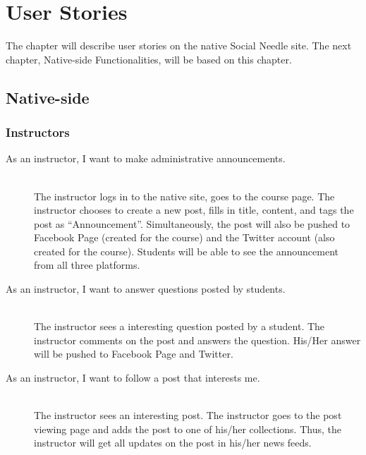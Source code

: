 
%
%

\chapter{User Stories}
The chapter will describe user stories on the native Social Needle site. The next chapter, Native-side Functionalities, will be based on this chapter. 

\section{Native-side}
\subsection{Instructors}
\begin{description}
	\item[As an instructor, I want to make administrative announcements.] \hfill \\
	The instructor logs in to the native site, goes to the course page. The instructor chooses to create a new post, fills in title, content, and tags the post as ``Announcement''. Simultaneously, the post will also be pushed to Facebook Page (created for the course) and the Twitter account (also created for the course). Students will be able to see the announcement from all three platforms.  
	\item[As an instructor, I want to answer questions posted by students.] \hfill \\
	The instructor sees a interesting question posted by a student. The instructor comments on the post and answers the question. His/Her answer will be pushed to Facebook Page and Twitter. 
	\item[As an instructor, I want to follow a post that interests me.] \hfill \\
	The instructor sees an interesting post. The instructor goes to the post viewing page and adds the post to one of his/her collections. Thus, the instructor will get all updates on the post in his/her news feeds.
\end{description}

